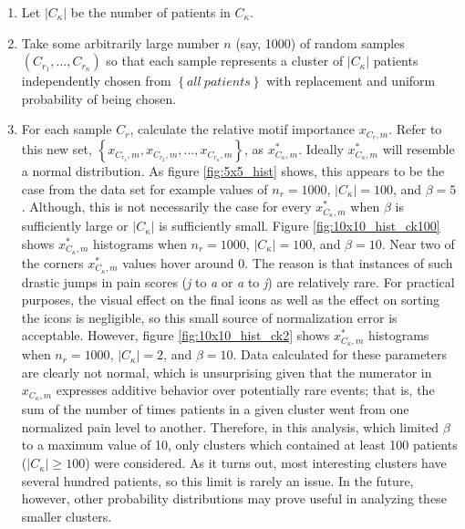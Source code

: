 \begin{enumerate}
  \item Let $|C_\kappa|$ be the number of patients in $C_\kappa$.
  \item Take some arbitrarily large number $n$ (say, 1000) of random samples $\left(C_{r_1},...,C_{r_n}\right)$ so that each sample represents a cluster of $|C_\kappa|$ patients independently chosen from $\left\{all\ patients\right\}$ with replacement and uniform probability of being chosen.
  \item For each sample $C_r$, calculate the relative motif importance $x_{C_r,m}$. Refer to this new set, $\left\{x_{C_{r_1},m}, x_{C_{r_2},m}, ..., x_{C_{r_n},m}\right\}$, as $x_{C_\kappa,m}^*$. Ideally $x_{C_\kappa,m}^*$ will resemble a normal distribution. As figure \ref{fig:5x5_hist} shows, this appears to be the case from the data set for example values of $n_r=1000$, $|C_\kappa|=100$, and $\beta=5$. Although, this is not necessarily the case for every $x_{C_\kappa,m}^*$ when $\beta$ is sufficiently large or $|C_\kappa|$ is sufficiently small. Figure \ref{fig:10x10_hist_ck100} shows $x_{C_\kappa,m}^*$ histograms when $n_r=1000$, $|C_\kappa|=100$, and $\beta=10$. Near two of the corners $x_{C_\kappa,m}^*$ values hover around 0. The reason is that instances of such drastic jumps in pain scores (\emph{j} to \emph{a} or \emph{a} to \emph{j}) are relatively rare. For practical purposes, the visual effect on the final icons as well as the effect on sorting the icons is negligible, so this small source of normalization error is acceptable. However, figure \ref{fig:10x10_hist_ck2} shows $x_{C_\kappa,m}^*$ histograms when $n_r=1000$, $|C_\kappa|=2$, and $\beta=10$. Data calculated for these parameters are clearly not normal, which is unsurprising given that the numerator in $x_{C_\kappa,m}$ expresses additive behavior over potentially rare events; that is, the sum of the number of times patients in a given cluster went from one normalized pain level to another. Therefore, in this analysis, which limited $\beta$ to a maximum value of 10, only clusters which contained at least 100 patients ($|C_\kappa|\geq100$) were considered. As it turns out, most interesting clusters have several hundred patients, so this limit is rarely an issue. In the future, however, other probability distributions may prove useful in analyzing these smaller clusters.
\begin{figure}

\end{figure}
\end{enumerate}
